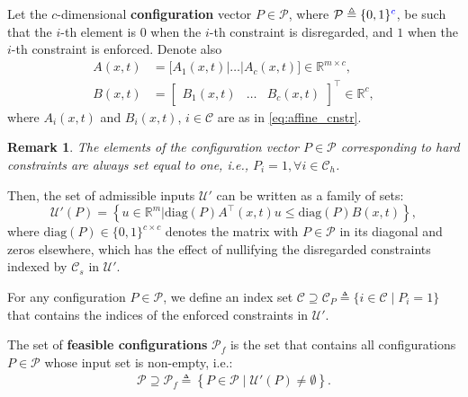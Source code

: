 \documentclass[letterpaper, 10 pt, conference]{ieeeconf}  %
\newtheorem{remark}{\textbf{Remark}}
\begin{document}
{Let the $c$-dimensional \textbf{configuration} vector $P\in \mathcal{P}$, where $\mathcal P \triangleq \{0,1\}{\color{blue}^c}$, be such that the $i$-th element is $0$ when the $i$-th constraint is disregarded, and $1$ when the $i$-th constraint is enforced. Denote also 
\begin{subequations}
\begin{align}
\label{eq:AB}
A(x,t) &= \bigl [A_1(x,t) | \dots | A_c(x,t)\bigr] \in \mathbb R^{m\times c},\\ B(x,t)&=\begin{bmatrix} B_1(x,t) &\dots & B_c(x,t) \end{bmatrix}^\top \in \mathbb R^c,
\end{align}
\end{subequations}
where $A_i(x,t)$ and $B_i(x,t)$, $i\in \mathcal C$ are as in  \eqref{eq:affine_cnstr}.  
\begin{remark}
\color{blue}
    The elements of the configuration vector $P\in\mathcal{P}$ corresponding to hard constraints are always set equal to one, i.e., $P_i = 1, \forall i \in \mathcal{C}_h$.
\end{remark}
Then, the set of admissible inputs $\mathcal{U}'$ can be written as a family of sets:
\begin{equation}\label{eq:input_set:config}
    \mathcal{U}'(P) = 
    \left\{
        u \in \mathbb{R}^m 
        | 
        \textrm{diag}(P)
        A^\top(x,t)u \leq
        \textrm{diag}(P)
        B(x,t)
    \right\},
\end{equation}
where {\color{blue}$\textrm{diag}(P)\in \{0,1\}^{c\times c}$} denotes the matrix with $P\in\mathcal{P}$ in its diagonal and zeros elsewhere, which has the effect of nullifying the disregarded constraints indexed by $\mathcal{C}_s$ in $\mathcal{U}'$. 
{\color{blue}
For any configuration $P\in\mathcal{P}$, we define an index set $\mathcal{C} \supseteq \mathcal{C}_P \triangleq \{ i \in \mathcal{C} \;| \; P_i =1 \}$ that contains the indices of the enforced constraints in $\mathcal{U}'$. 

}
\par
The set of \textbf{feasible configurations} $\mathcal{P}_f$ is the set that contains all configurations $P\in\mathcal P$ whose input set is non-empty, i.e.: 
\begin{equation}\label{eq:feas_conf_set_def}
\begin{gathered}
    \mathcal{P} \supseteq \mathcal{P}_f \triangleq  
    \left\{ 
            P \in \mathcal{P} \; | \;  
            \mathcal{U}'(P)\neq \emptyset 
    \right\}.
\end{gathered}\end{equation}




}
\end{document}
